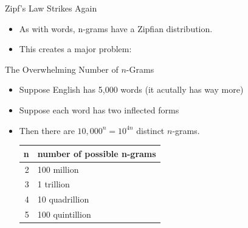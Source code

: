 \documentclass[professionalfonts, xcolor={usenames,svgnames,x11names,table}]{beamer}
\begin{document}
\begin{frame}{Zipf's Law Strikes Again}
    \begin{itemize}
        \item As with words, n-grams have a Zipfian distribution.
        \item This creates a major problem: 
    \end{itemize}

    \begin{block}{The Overwhelming Number of $n$-Grams}
        \begin{itemize}
            \item Suppose English has 5,000 words (it acutally has way more)
            \item Suppose each word has two inflected forms\\
            \item Then there are $10,000^n = 10^{4n}$ distinct $n$-grams.
                \begin{center}
                    \begin{tabular}{rl}
                        \toprule
                        \textbf{n} & \textbf{number of possible n-grams}\\
                        \midrule
                        2 & 100 million\\
                        3 & 1 trillion\\
                        4 & 10 quadrillion\\
                        5 & 100 quintillion\\
                        \bottomrule
                    \end{tabular}
                \end{center}
        \end{itemize}
    \end{block}
\end{frame}
\end{document}
